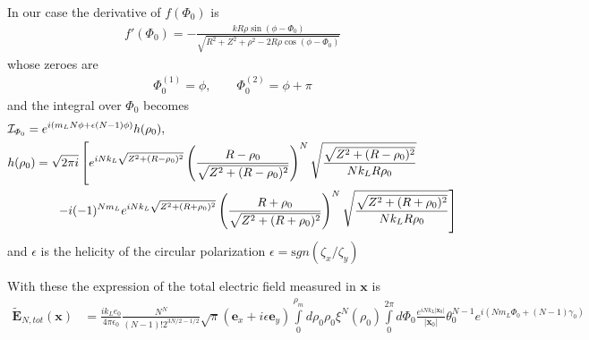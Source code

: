   In our case the derivative of  $f(\varPhi_0)$ is
  \begin{align}
    f'(\varPhi_0)=-\frac{k R \rho \sin(\phi-\varPhi_0)}{\sqrt{R^2+Z^2+\rho^2-2 R \rho \cos(\phi-\varPhi_0)}}
  \end{align}
  whose zeroes are
  \begin{align}
    \Phi_0^{(1)} = \phi,\qquad \Phi^{(2)}_0=\phi+\pi
  \end{align}
  and the integral over $\varPhi_0$ becomes
  \begin{align}
    & {\cal I}_{\varPhi_0}=e^{i(m_LN\phi+\epsilon(N-1)\phi)}h(\rho_0),\nonumber                                                                                                              \\
    & h(\rho_0)=\sqrt{2\pi i}\left[e^{iNk_L\sqrt{Z^2+(R-\rho_0)^2}}\left(\frac{R-\rho_0}{\sqrt{Z^2+(R-\rho_0)^2}}\right)^N\sqrt{\frac{\sqrt{Z^2+(R-\rho_0)^2}}{Nk_LR\rho_0}}\right.\nonumber \\
    & \qquad\qquad\left.-i(-1)^{Nm_L}e^{iNk_L\sqrt{Z^2+(R+\rho_0)^2}}\left(\frac{R+\rho_0}{\sqrt{Z^2+(R+\rho_0)^2}}\right)^N\sqrt{\frac{\sqrt{Z^2+(R+\rho_0)^2}}{Nk_LR\rho_0}}\right]
  \end{align}
  and $\epsilon$ is the helicity of the circular polarization $\epsilon={\mathrm sgn}(\zeta_x/\zeta_y)$

  With these the expression of the total  electric field measured in ${\bm x}$ is
  \begin{align}
    \tilde {\bm E}_{N,tot}({\bm x}) & =\frac{i k_L  e_0}{4\pi\epsilon_0}\frac{N^N}{(N-1)!2^{3N/2-1/2}}\sqrt{\pi}({\bm e}_x+i \epsilon{\bm e}_y)\int\limits_0^{\rho_m}d\rho_0\rho_0\xi^N(\rho_0)\int\limits_0^{2\pi}d\varPhi_0  \frac{e^{iNk_L|{\bm x}_0|}}{|{\bm x}_0|}\theta_0^{N-1}e^{i(Nm_L\varPhi_0+(N-1)\gamma_0)}\nonumber
  \end{align}
